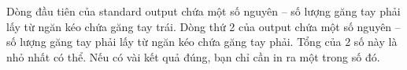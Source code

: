 Dòng đầu tiên của standard output chứa một số nguyên – số lượng găng tay phải lấy từ ngăn kéo chứa găng tay trái. Dòng thứ 2 của output chứa một số nguyên – số lượng găng tay phải lấy từ ngăn kéo chứa găng tay phải. Tổng của 2 số này là nhỏ nhất có thể. Nếu có vài kết quả đúng, bạn chỉ cần in ra một trong số đó.